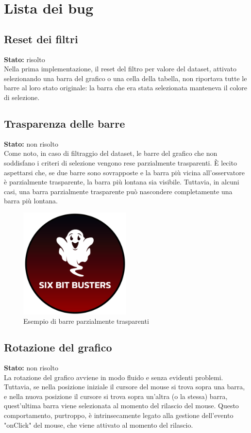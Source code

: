 \section{Lista dei bug}
\subsection{Reset dei filtri}
\textbf{Stato:} risolto\\
Nella prima implementazione, il reset del filtro per valore del dataset,
attivato selezionando una barra del grafico o una cella della tabella,
non riportava tutte le barre al loro stato originale: la barra che era
stata selezionata manteneva il colore di selezione.

\subsection{Trasparenza delle barre}
\textbf{Stato:} non risolto\\
Come noto, in caso di filtraggio del dataset, le barre del grafico
che non soddisfano i criteri di selezione vengono rese parzialmente trasparenti.
È lecito aspettarsi che, se due barre sono sovrapposte e la barra più vicina all'osservatore
è parzialmente trasparente, la barra più lontana sia visibile. Tuttavia, in alcuni casi,
una barra parzialmente trasparente può nascondere completamente una barra più lontana.
\begin{figure}[h!]
    \centering
    \includegraphics[width=0.5\textwidth]{template/images/logo-circle.png}
    \caption{Esempio di barre parzialmente trasparenti}
    \label{fig:trasparenza}
\end{figure}

\subsection{Rotazione del grafico}
\textbf{Stato:} non risolto\\
La rotazione del grafico avviene in modo fluido e senza evidenti problemi. Tuttavia,
se nella posizione iniziale il cursore del mouse si trova sopra una barra, e
nella nuova posizione il cursore si trova sopra un'altra (o la stessa) barra,
quest'ultima barra viene selezionata al momento del rilascio del mouse.
Questo comportamento, purtroppo, è intrinsecamente legato alla
gestione dell'evento "onClick" del mouse, che viene attivato al momento del rilascio.
